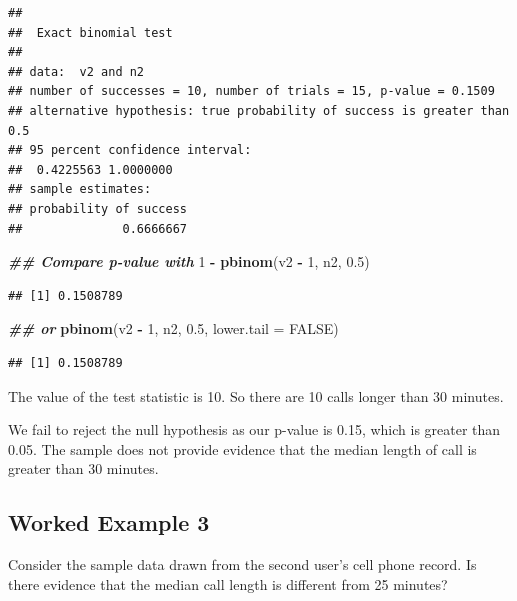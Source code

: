 \documentclass[
]{book}
\newenvironment{Shaded}{\begin{snugshade}}{\end{snugshade}}
\newcommand{\AttributeTok}[1]{\textcolor[rgb]{0.13,0.29,0.53}{#1}}
\newcommand{\ConstantTok}[1]{\textcolor[rgb]{0.56,0.35,0.01}{#1}}
\newcommand{\DecValTok}[1]{\textcolor[rgb]{0.00,0.00,0.81}{#1}}
\newcommand{\DocumentationTok}[1]{\textcolor[rgb]{0.56,0.35,0.01}{\textbf{\textit{#1}}}}
\newcommand{\FloatTok}[1]{\textcolor[rgb]{0.00,0.00,0.81}{#1}}
\newcommand{\FunctionTok}[1]{\textcolor[rgb]{0.13,0.29,0.53}{\textbf{#1}}}
\newcommand{\NormalTok}[1]{#1}
\newcommand{\SpecialCharTok}[1]{\textcolor[rgb]{0.81,0.36,0.00}{\textbf{#1}}}
\theoremstyle{definition}
\theoremstyle{definition}
\theoremstyle{definition}
\theoremstyle{definition}
\theoremstyle{remark}
\begin{document}
\begin{verbatim}
## 
##  Exact binomial test
## 
## data:  v2 and n2
## number of successes = 10, number of trials = 15, p-value = 0.1509
## alternative hypothesis: true probability of success is greater than 0.5
## 95 percent confidence interval:
##  0.4225563 1.0000000
## sample estimates:
## probability of success 
##              0.6666667
\end{verbatim}

\begin{Shaded}
\begin{Highlighting}[]
\DocumentationTok{\#\# Compare p{-}value with}
\DecValTok{1} \SpecialCharTok{{-}} \FunctionTok{pbinom}\NormalTok{(v2 }\SpecialCharTok{{-}} \DecValTok{1}\NormalTok{, n2, }\FloatTok{0.5}\NormalTok{)}
\end{Highlighting}
\end{Shaded}

\begin{verbatim}
## [1] 0.1508789
\end{verbatim}

\begin{Shaded}
\begin{Highlighting}[]
\DocumentationTok{\#\# or}
\FunctionTok{pbinom}\NormalTok{(v2 }\SpecialCharTok{{-}} \DecValTok{1}\NormalTok{, n2, }\FloatTok{0.5}\NormalTok{, }\AttributeTok{lower.tail =} \ConstantTok{FALSE}\NormalTok{)}
\end{Highlighting}
\end{Shaded}

\begin{verbatim}
## [1] 0.1508789
\end{verbatim}

The value of the test statistic is 10. So there are 10 calls longer than 30 minutes.

We fail to reject the null hypothesis as our p-value is 0.15, which is greater than 0.05. The sample does not provide evidence that the median length of call is greater than 30 minutes.

\hypertarget{worked-example-3-1}{%
\subsection{Worked Example 3}\label{worked-example-3-1}}

Consider the sample data drawn from the second user's cell phone record. Is there evidence that the median call length is different from 25 minutes?
\end{document}
